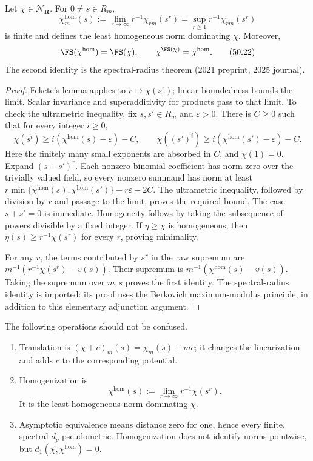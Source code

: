 \begin{proposition}
\label{prop:ch50-homogenization}
Let $\chi\in\mathcal N_{\mathbf R}$.  For $0\ne s\in R_m$,
\[
 \chi^{\hom}_m(s):=\lim_{r\to\infty}r^{-1}\chi_{rm}(s^r)
 =\sup_{r\ge1}r^{-1}\chi_{rm}(s^r)
\tag{50.21}\label{eq:ch50-homogenization-def}
\]
is finite and defines the least homogeneous norm dominating $\chi$.
Moreover,
\[
 \FS(\chi^{\hom})=\FS(\chi),\qquad
 \chi^{\FS(\chi)}=\chi^{\hom}.
\tag{50.22}\label{eq:ch50-fs-homog}
\]
The second identity is the spectral-radius theorem
\cite[Theorem~2.16]{BJKS1} (2021 preprint, 2025 journal).
\end{proposition}

\begin{proof}
Fekete's lemma applies to $r\mapsto\chi(s^r)$; linear boundedness
bounds the limit.  Scalar invariance and superadditivity for products
pass to that limit.  To check the ultrametric inequality, fix $s,s'\in R_m$
and $\varepsilon>0$.  There is $C\ge0$ such that for every integer
$i\ge0$,
\[
 \chi(s^i)\ge i(\chi^{\hom}(s)-\varepsilon)-C,
 \qquad
 \chi((s')^i)\ge i(\chi^{\hom}(s')-\varepsilon)-C.
\]
Here the finitely many small exponents are absorbed in $C$, and
$\chi(1)=0$.  Expand $(s+s')^r$.  Each nonzero binomial coefficient
has norm zero over the trivially valued field, so every nonzero summand
has norm at least
$r\min\{\chi^{\hom}(s),\chi^{\hom}(s')\}-r\varepsilon-2C$.
The ultrametric inequality, followed by division by $r$ and passage to
the limit, proves the required bound.  The case $s+s'=0$ is immediate.
Homogeneity follows by taking the subsequence of powers divisible by a
fixed integer.  If $\eta\ge\chi$ is homogeneous, then
$\eta(s)\ge r^{-1}\chi(s^r)$ for every $r$, proving minimality.

For any $v$, the terms contributed by $s^r$ in the raw supremum are
$m^{-1}(r^{-1}\chi(s^r)-v(s))$.  Their supremum is
$m^{-1}(\chi^{\hom}(s)-v(s))$.  Taking the supremum over $m,s$
proves the first identity.  The spectral-radius identity is imported:
its proof uses the Berkovich maximum-modulus principle, in addition to
this elementary adjunction argument.
\end{proof}

\begin{remark}
\label{rem:stability-three-equivalences}
The following operations should not be confused.
\begin{enumerate}
\item Translation is
      $(\chi+c)_m(s)=\chi_m(s)+mc$; it changes the linearization and adds
      $c$ to the corresponding potential.
\item Homogenization is
      \[
                 \chi^{\hom}(s)
                  :=\lim_{r\to\infty}r^{-1}\chi(s^r).
      \tag{50.23}\label{eq:stability-homogenization}
      \]
      It is the least homogeneous norm dominating $\chi$.
\item Asymptotic equivalence means distance zero for one, hence every
      finite, spectral $d_p$-pseudometric.  Homogenization does not
      identify norms pointwise, but
      $d_1(\chi,\chi^{\hom})=0$.
\end{enumerate}
\end{remark}

